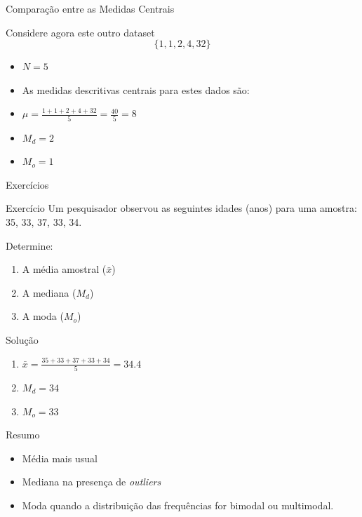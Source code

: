 \documentclass{beamer}
\begin{document}
\begin{frame}{Comparação entre as Medidas Centrais}
  \begin{example}Considere agora este outro dataset $$\{
    1,1,2,4,32 \}$$
  \begin{itemize}
  \item $N=5$
  \item As medidas descritivas centrais para estes dados são:
  \item $\mu = \frac{1+1+2+4+32}{5} = \frac{40}{5}= 8$
  \item $M_d = 2$
  \item $M_o = 1$
  \end{itemize}
\end{example}
\end{frame}

\begin{frame}{Exercícios}
  \begin{block}{Exercício}
    Um pesquisador observou as seguintes idades (anos) para uma amostra:
    35, 33, 37, 33, 34.
    
    Determine:
    \begin{enumerate}
    \item<1-> A média amostral ($\bar{x}$)
    \item<1-> A mediana ($M_d$)
    \item<1-> A moda ($M_o$)
    \end{enumerate}
  \end{block}
  
  \begin{block}{Solução}
    \begin{enumerate}
    \item $\bar{x} = \frac{35+33+37+33+34}{5} = 34.4$
    \item $M_d = 34$
    \item $M_o = 33$
    \end{enumerate}
  \end{block}
\end{frame}

\begin{frame}{Resumo}
  \begin{itemize}
  \item Média mais usual
  \item Mediana na presença de {\it outliers}
  \item Moda quando a distribuição das frequências for bimodal ou multimodal.
  \end{itemize}
  
\end{frame}
\end{document}
